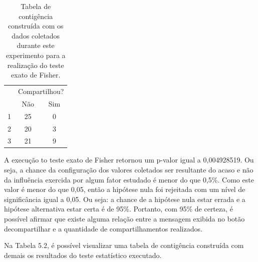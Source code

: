 \begin{table}[h]
\centering
\label{tab:tab1}
\begin{tabular}{ccc}
\hline
\cellcolor[HTML]{C0C0C0}{\color[HTML]{333333} }                                       & \multicolumn{2}{l}{\cellcolor[HTML]{C0C0C0}Compartilhou?} \\ \cline{2-3} 
\multirow{-2}{*}{\cellcolor[HTML]{C0C0C0}{\color[HTML]{333333} Mensagem visualizada}} & Não                          & Sim                        \\ \hline
1                                                                                     & \cellcolor[HTML]{EFEFEF}25   & \cellcolor[HTML]{EFEFEF}0  \\ \hline
2                                                                                     & \cellcolor[HTML]{EFEFEF}20   & \cellcolor[HTML]{EFEFEF}3  \\ \hline
3                                                                                     & \cellcolor[HTML]{EFEFEF}21   & \cellcolor[HTML]{EFEFEF}9  \\ \hline
\end{tabular}
\caption{Tabela de contigência construída com os dados coletados durante este experimento para a realização do teste exato de Fisher.}
\end{table}

A execução to teste exato de Fisher retornou um p-valor igual a 0,004928519. Ou seja, a chance da configuração dos valores coletados ser resultante do acaso e não da influência exercida por algum fator estudado é menor do que 0,5\%. Como este valor é menor do que 0,05, então a hipótese nula foi rejeitada com um nível de significância igual a 0,05. Ou seja: a chance de a hipótese nula estar errada e a hipótese alternativa estar certa é de 95\%. Portanto, com 95\% de certeza, é possível afirmar que existe alguma relação entre a mensagem exibida no botão decompartilhar e a quantidade de compartilhamentos realizados.

Na Tabela 5.2, é possível visualizar uma tabela de contigência construída com demais os resultados do teste estatístico executado.

